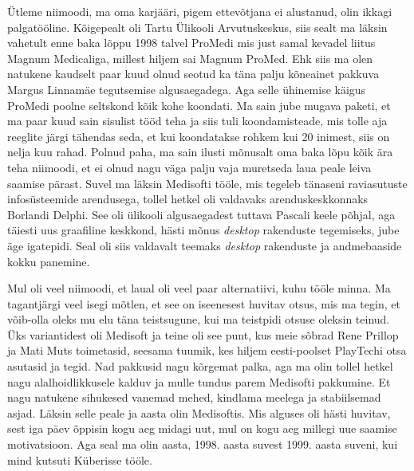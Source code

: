 Ütleme niimoodi, ma oma karjääri, pigem ettevõtjana ei alustanud, olin 
ikkagi palgatööline. Kõigepealt oli Tartu Ülikooli Arvutuskeskus, siis sealt ma 
läksin vahetult enne baka lõppu 1998 talvel   
ProMedi mis just samal kevadel liitus Magnum 
Medicaliga, millest hiljem sai Magnum ProMed. Ehk siis ma 
olen natukene kaudselt paar kuud olnud seotud ka täna palju kõneainet pakkuva 
Margus Linnamäe tegutsemise algusaegadega. Aga 
selle ühinemise käigus ProMedi poolne seltskond kõik kohe koondati. 
Ma sain jube mugava paketi, et ma paar kuud sain sisulist tööd teha ja siis tuli 
koondamisteade, mis tolle aja reeglite järgi tähendas seda, et kui koondatakse 
rohkem kui 20 inimest, siis on nelja kuu rahad. Polnud paha, ma sain ilusti 
mõnusalt oma baka lõpu kõik ära teha niimoodi, et ei olnud nagu väga palju vaja 
muretseda laua peale leiva saamise pärast.  Suvel ma läksin 
Medisofti tööle, mis tegeleb tänaseni  raviasutuste 
infosüsteemide arendusega, tollel hetkel oli valdavaks arenduskeskkonnaks 
Borlandi Delphi. See oli ülikooli algusaegadest 
tuttava Pascali keele põhjal, aga täiesti uus graafiline keskkond, hästi mõnus 
\emph{desktop} rakenduste tegemiseks, jube äge igatepidi. Seal oli siis 
valdavalt teemaks \emph{desktop} rakenduste ja andmebaaside kokku panemine. 

Mul oli veel niimoodi, et  laual oli veel paar alternatiivi,  kuhu tööle 
minna. Ma tagantjärgi veel isegi mõtlen, et see on iseenesest huvitav otsus, 
mis ma tegin, et võib-olla oleks mu elu täna teistsugune, kui ma teistpidi 
otsuse oleksin teinud. Üks variantidest oli Medisoft ja teine oli 
 see punt, kus meie sõbrad Rene Prillop 
ja Mati Muts toimetasid, seesama 
tuumik, kes hiljem eesti-poolset PlayTechi otsa  asutasid ja 
tegid. Nad pakkusid nagu kõrgemat palka, aga ma olin tollel hetkel nagu 
alalhoidlikkusele kalduv ja mulle tundus parem Medisofti pakkumine. Et nagu natukene 
sihukesed vanemad mehed, kindlama meelega ja stabiilsemad asjad. Läksin 
selle peale ja aasta olin Medisoftis. Mis alguses oli hästi huvitav, sest 
iga päev õppisin kogu aeg midagi uut, mul on kogu aeg millegi uue saamise 
motivatsioon.  Aga seal ma olin aasta, 1998. aasta suvest 1999. aasta suveni, 
kui mind kutsuti Küberisse tööle. 

